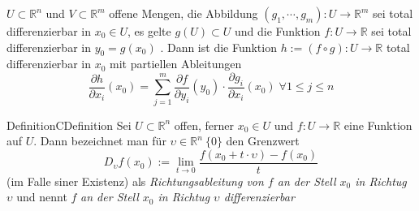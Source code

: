 %
%		
%		

$U\subset \mathbb{R} ^n$ und $V\subset \mathbb{R} ^m$ offene Mengen, die Abbildung
$ \left( g_1 , \cdots, g_{m} \right) : U \to \mathbb{R}^m  $ sei total differenzierbar in $ x_0 \in U $,
es gelte $ g(U) \subset U $ und die Funktion $ f: U \to \mathbb{R}  $ sei total differenzierbar in 
$ y_0 = g(x_0) $ . Dann ist die Funktion $ h:= (f \circ g): U \to \mathbb{R}  $ total differenzierbar in 
$ x_0 $ mit partiellen Ableitungen 
$$ \frac{\partial h}{\partial x_{i}} (x_0) = \sum_{j=1}^{m} \frac{\partial f }{\partial y_{i}} (y_0)
\cdot \frac{\partial g_{i}}{\partial x_{i}} (x_0)  \;  \forall 1 \leq j \leq n$$ 


\begin{ibox}[]{Definition}{CDefinition}
    Sei $ U \subset  \mathbb{R}^n  $ offen, ferner $ x_0 \in U $ und $ f: U \to \mathbb{R}  $ eine 
	Funktion auf $ U $. Dann bezeichnet man für $ \upsilon \in  \mathbb{R}^n \ \{0\} $ den Grenzwert 
	$$ D_{\upsilon}f(x_0) := \lim_{t \to 0} \frac{f(x_0 + t \cdot \upsilon)-f(x_0)}{t}  $$
	(im Falle siner Existenz) als \textit{Richtungsableitung von $ f $ an der Stell $ x_0 $ in Richtug $ \upsilon $ } 
	und nennt $ f $ \textit{ an der Stell $ x_0 $ in Richtug $ \upsilon $ differenzierbar} 
\end{ibox}

